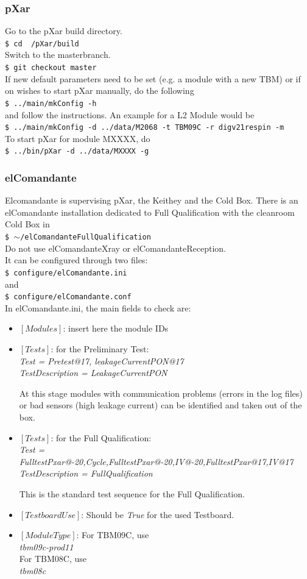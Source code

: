 \documentclass[fleqn,10pt]{SelfArx} %
\newcommand{\shellcmd}[1]{\\\indent\indent\texttt{\footnotesize\$ #1}\\}
\begin{document}
\subsubsection{pXar}
Go to the pXar build directory. 
\shellcmd{cd ~/pXar/build}
Switch to the masterbranch.
\shellcmd{git checkout master}
If new default parameters need to be set (e.g. a module with a new TBM) or if on wishes to start pXar manually, do the following
\shellcmd{../main/mkConfig -h }
and follow the instructions. An example for a L2 Module would be 
\shellcmd{../main/mkConfig -d ../data/M2068 -t TBM09C -r digv21respin -m}
To start pXar for module MXXXX, do
\shellcmd{../bin/pXar -d ../data/MXXXX -g}

\subsubsection{elComandante}\label{elcom}
Elcomandante is supervising pXar, the Keithey and the Cold Box. There is an elComandante installation dedicated to Full Qualification with the cleanroom Cold Box in 
\shellcmd{ $\sim$/elComandanteFullQualification} 
Do not use elComandanteXray or elComandanteReception. \\
It can be configured through two files:
\shellcmd{configure/elComandante.ini}
and
\shellcmd{configure/elComandante.conf}
In elComandante.ini, the main fields to check are:
\begin{itemize}
\item $[Modules]$: insert here the module IDs
\item $[Tests]$: for the Preliminary Test:\\
{\it Test = Pretest@17, leakageCurrentPON@17}\\
{\it TestDescription = LeakageCurrentPON}

At this stage modules with communication problems (errors in the log files) or bad sensors (high leakage current) can be identified and taken out of the box.
\item $[Tests]$: for the Full Qualification:\\
{\it Test = FulltestPxar@-20,Cycle,FulltestPxar@-20,IV@-20,FulltestPxar@17,IV@17}\\
{\it TestDescription = FullQualification}

This is the standard test sequence for the Full Qualification.
\item $[TestboardUse]$: Should be {\it True} for the used Testboard.
\item $[ModuleType]$: 
For TBM09C, use \\
{\it tbm09c-prod11}\\
For TBM08C, use \\
{\it tbm08c}
\end{itemize}
\end{document}
